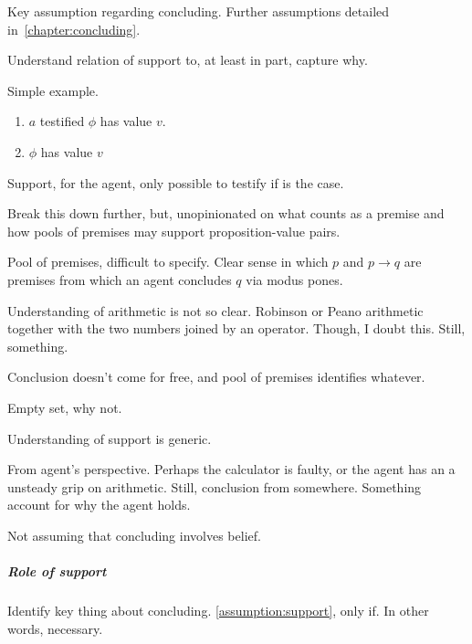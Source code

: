 \begin{note}
  Key assumption regarding concluding.
  Further assumptions detailed in~\autoref{chapter:concluding}.
\end{note}

\begin{note}
  Understand relation of support to, at least in part, capture why.

  Simple example.

  \begin{enumerate}
  \item
    \(a\) testified \(\phi\) has value \(v\).
  \item
    \(\phi\) has value \(v\)
  \end{enumerate}

  Support, for the agent, only possible to testify if is the case.

  Break this down further, but, unopinionated on what counts as a premise and how pools of premises may support proposition-value pairs.
\end{note}


\begin{note}
  Pool of premises, difficult to specify.
  Clear sense in which \(p\) and \(p \rightarrow q\) are premises from which an agent concludes \(q\) via modus pones.

  Understanding of arithmetic is not so clear.
  Robinson or Peano arithmetic together with the two numbers joined by an operator.
  Though, I doubt this.
  Still, something.

  Conclusion doesn't come for free, and pool of premises identifies whatever.

  Empty set, why not.
\end{note}

\begin{note}
  Understanding of support is generic.

  From agent's perspective.
  Perhaps the calculator is faulty, or the agent has an a unsteady grip on arithmetic.
  Still, conclusion from somewhere.
  Something account for why the agent holds.
\end{note}

\begin{note}
  {
    \color{red}
    Not assuming that concluding involves belief.
  }
\end{note}

\subparagraph{Role of support}

\begin{note}
  Identify key thing about concluding.
  \autoref{assumption:support}, only if.
  In other words, necessary.
\end{note}


